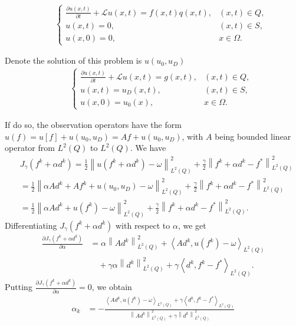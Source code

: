 \documentclass[notitlepage,a4paper,fleqn,9pt]{icmfarticle}
\begin{document}
\begin{multicols}{2}
\begin{bt}
	\begin{align*}
		\qquad\begin{cases}
			\frac{\partial u(x, t)}{\partial t}+\mathcal{L}u(x, t)=f(x, t)q(x, t),&(x, t)\in Q,\\
			u(x, t)=0, & (x, t)\in S,\\
			u(x, 0)=0,&x\in \Omega.
		\end{cases}
	\end{align*}
\end{bt}
\begin{bt}\label{bt2.2}
	Denote the solution of this problem is $u(u_0, u_D)$
	\begin{align*}
		\qquad\begin{cases}
			\frac{\partial u(x, t)}{\partial t}+\mathcal{L}u(x, t)=g(x, t),&(x, t)\in Q,\\
			u(x, t)=u_D(x, t), & (x, t)\in S,\\
			u(x, 0)=u_0(x),&x\in \Omega.
		\end{cases}
	\end{align*}
\end{bt}
\noindent If do so, the observation operators have the form $u(f)= u[f]+ u(u_0, u_D)=Af+ u(u_0, u_D)$, with $A$ being bounded linear operator from $L^2(Q)$ to $L^2(Q)$.
We have
\begin{align*}
	&J_{\gamma}(f^k+\alpha d^k)=\frac{1}{2}\left\| u(f^k+\alpha d^k)-\omega\right\|_{L^2(Q)}^2+\frac{\gamma}{2}\left\|f^k+\alpha d^k-f^*\right\|_{L^2(Q)}^2\\[0.2cm]
	&=\frac{1}{2}\left\|\alpha Ad^k+Af^k+ u(u_0, u_D)-\omega\right\|_{L^2(Q)}^2+\frac{\gamma}{2}\left\|f^k+\alpha d^k-f^*\right\|_{L^2(Q)}^2\\[0.2cm]
	&=\frac{1}{2}\left\|\alpha Ad^k+ u(f^k)-\omega\right\|_{L^2(Q)}^2+\frac{\gamma}{2}\left\|f^k+\alpha d^k-f^*\right\|_{L^2(Q)}^2.
\end{align*}
Differentiating $J_\gamma(f^k+\alpha d^k)$ with respect to $\alpha$, we get
\begin{align*}
\frac{\partial J_\gamma(f^k+\alpha d^k)}{\partial \alpha} &= \alpha\left\|Ad^k \right\|_{L^2(Q)}^2+\left\langle Ad^k, u(f^k)-\omega\right\rangle_{L^2(Q)}\\[0.2cm]
&\quad+\gamma\alpha\left\| d^k\right\|_{L^2(Q)}^2+\gamma\left\langle d^k, f^k-f^*\right\rangle_{L^2(Q)}.
\end{align*}
Putting $\frac{\partial J_\gamma(f^k+\alpha d^k)}{\partial \alpha}=0$, we obtain
\begin{align*}
\alpha_k&=-\frac{\displaystyle\left\langle Ad^k,  u(f^k)-\omega\right\rangle_{L^2(Q)}+\gamma\left\langle d^k, f^k-f^*\right\rangle_{L^2(Q)}}{\displaystyle\left\|Ad^k\right\|^2_{L^2(Q)}+\gamma\left\|d^k\right\|^2_{L^2(Q)}}\\[0.2cm]

\end{align*}
\end{multicols}
\end{document}

